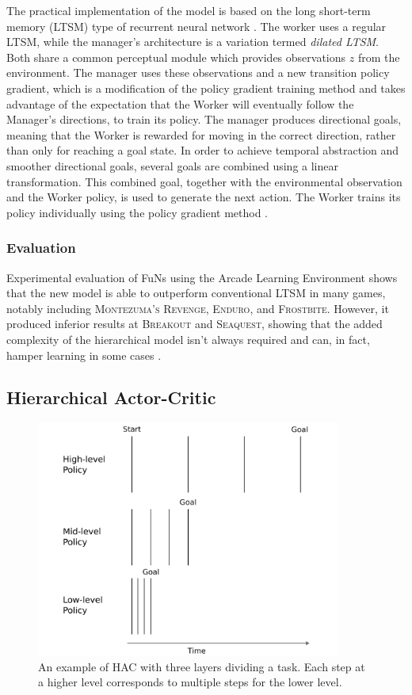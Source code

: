 \documentclass[runningheads]{llncs}
\begin{document}
The practical implementation of the model is based on the long short-term memory (LTSM) type of recurrent neural network \cite{hochreiter1997long,vezhnevets2017feudal}. The worker uses a regular LTSM, while the manager's architecture is a variation termed \textit{dilated LTSM}. Both share a common perceptual module which provides observations $z$ from the environment. The manager uses these observations and a new transition policy gradient, which is a modification of the policy gradient training method and takes advantage of the expectation that the Worker will eventually follow the Manager's directions, to train its policy. The manager produces directional goals, meaning that the Worker is rewarded for moving in the correct direction, rather than only for reaching a goal state. In order to achieve temporal abstraction and smoother directional goals, several goals are combined using a linear transformation. This combined goal, together with the environmental observation and the Worker policy, is used to generate the next action. The Worker trains its policy individually using the policy gradient method \cite{vezhnevets2017feudal}. 

\subsubsection{Evaluation}

Experimental evaluation of FuNs using the Arcade Learning Environment shows that the new model is able to outperform conventional LTSM in many games, notably including \textsc{Montezuma's Revenge}, \textsc{Enduro}, and \textsc{Frostbite}. However, it produced inferior results at \textsc{Breakout} and \textsc{Seaquest}, showing that the added complexity of the hierarchical model isn't always required and can, in fact, hamper learning in some cases \cite{vezhnevets2017feudal}.

\subsection{Hierarchical Actor-Critic}

\begin{figure}
    \centering
    \includegraphics[width=10cm]{submission/figures/figure-hactask.pdf}
    \caption{An example of HAC with three layers dividing a task. Each step at a higher level corresponds to multiple steps for the lower level. \cite{levy2017hierarchical}}
    \label{fig-hactask}
\end{figure}
\end{document}

